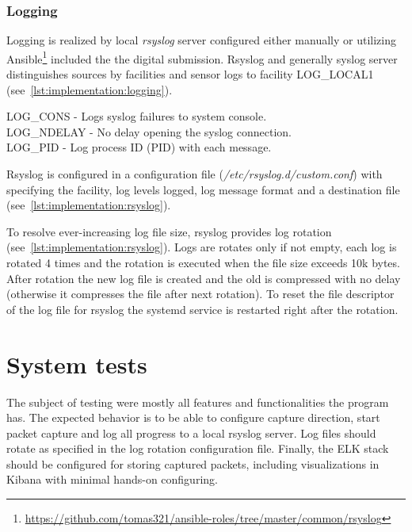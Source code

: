 \documentclass[12pt,a4paper,twoside]{book}
\begin{document}
        \subsection{Logging} \label{implementation:sensor:logging}
            Logging is realized by local \emph{rsyslog} server configured either manually or utilizing Ansible\footnote{\url{https://github.com/tomas321/ansible-roles/tree/master/common/rsyslog}} included the the digital submission. Rsyslog and generally syslog server distinguishes sources by facilities \cite{man:syslog} and sensor logs to facility LOG\_LOCAL1 (see~\autoref{lst:implementation:logging}).
            
            LOG\_CONS - Logs syslog failures to system console.\\
            LOG\_NDELAY - No delay opening the syslog connection.\\
            LOG\_PID - Log process ID (PID) with each message.\par
            Rsyslog is configured in a configuration file (\emph{/etc/rsyslog.d/custom.conf}) with specifying the facility, log levels logged, log message format and a destination file (see~\autoref{lst:implementation:rsyslog}).
            \par
            To resolve ever-increasing log file size, rsyslog provides log rotation (see~\autoref{lst:implementation:rsyslog}). Logs are rotates only if not empty, each log is rotated 4 times and the rotation is executed when the file size exceeds 10k bytes. After rotation the new log file is created and the old is compressed with no delay (otherwise it compresses the file after next rotation). To reset the file descriptor of the log file for rsyslog the systemd service is restarted right after the rotation.
            
\chapter{System tests} \label{tests}
    The subject of testing were mostly all features and functionalities the program has. The expected behavior is to be able to configure capture direction, start packet capture and log all progress to a local rsyslog server. Log files should rotate as specified in the log rotation configuration file. Finally, the ELK stack should be configured for storing captured packets, including visualizations in Kibana with minimal hands-on configuring.
\end{document}
